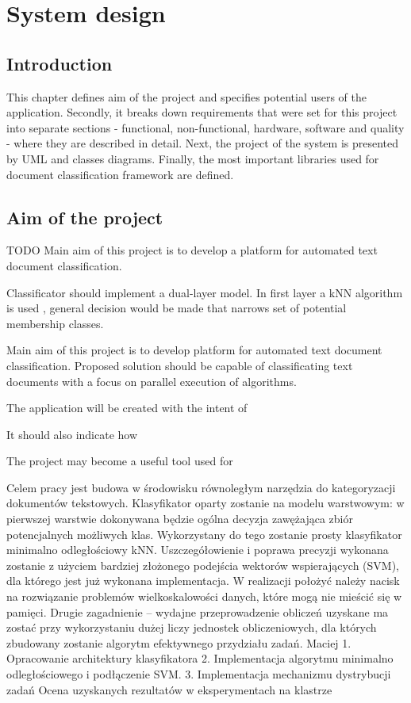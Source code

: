 \chapter{System design} \label{des}
\section{Introduction}
This chapter defines aim of the project and specifies potential users of the application. Secondly, it breaks down requirements that were set for this project into separate sections - functional, non-functional, hardware, software and quality -  where they are described in detail. Next, the project of the system is presented by UML and classes diagrams. Finally, the most important libraries used for document classification framework are defined.

\section{Aim of the project}
TODO
Main aim of this project is to develop a platform for automated text document classification. 

Classificator should implement a dual-layer model. In first layer a kNN algorithm is used , general decision would be made that narrows set of potential membership classes.

Main aim of this project is to develop platform for automated text document classification. Proposed solution should be capable of classificating text documents with a focus on parallel execution of algorithms.


The application will be created with the intent of 

It should also indicate how 

The project may become a useful tool used for 


Celem pracy jest  budowa w środowisku równoległym narzędzia do kategoryzacji dokumentów tekstowych. Klasyfikator oparty zostanie na modelu warstwowym: w pierwszej warstwie dokonywana będzie ogólna decyzja zawężająca zbiór potencjalnych możliwych klas. Wykorzystany do tego zostanie prosty klasyfikator minimalno odległościowy kNN. Uszczegółowienie i poprawa precyzji wykonana zostanie z użyciem bardziej złożonego podejścia wektorów wspierających (SVM), dla którego jest już wykonana implementacja.  W realizacji położyć należy nacisk na rozwiązanie problemów wielkoskalowości danych, które mogą nie mieścić się w pamięci. Drugie zagadnienie – wydajne przeprowadzenie obliczeń uzyskane ma zostać przy wykorzystaniu dużej liczy jednostek obliczeniowych, dla których zbudowany zostanie algorytm efektywnego przydziału zadań.
Maciej
1.	Opracowanie architektury klasyfikatora 
2.	Implementacja algorytmu minimalno odległościowego i podłączenie SVM.
3.	Implementacja mechanizmu dystrybucji zadań 
Ocena uzyskanych rezultatów w eksperymentach na klastrze


